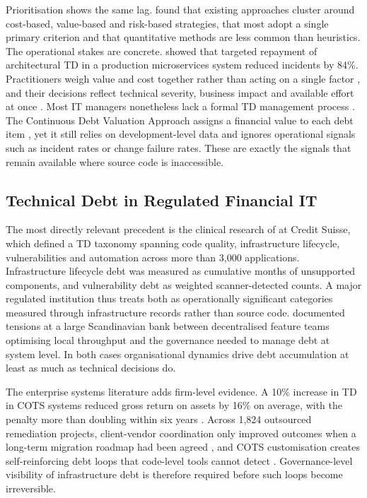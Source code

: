 \documentclass[
  authoryear,
  preprint]{elsarticle}
\begin{document}
Prioritisation shows the same lag.
\citet{lenarduzziSystematicLiteratureReview2021} found that existing
approaches cluster around cost-based, value-based and risk-based
strategies, that most adopt a single primary criterion and that
quantitative methods are less common than heuristics. The operational
stakes are concrete. \citet{detoledoReducingIncidentsMicroservices2021}
showed that targeted repayment of architectural TD in a production
microservices system reduced incidents by 84\%. Practitioners weigh
value and cost together rather than acting on a single factor
\citep{alfayezHowSonarQubeidentifiedTechnical2023}, and their decisions
reflect technical severity, business impact and available effort at once
\citep{pinaTechnicalDebtPrioritization2022}. Most IT managers
nonetheless lack a formal TD management process
\citep{wieseITManagersPerspective2023}. The Continuous Debt Valuation
Approach assigns a financial value to each debt item
\citep{stochelBusinessdrivenTechnicalDebt2023}, yet it still relies on
development-level data and ignores operational signals such as incident
rates or change failure rates. These are exactly the signals that remain
available where source code is inaccessible.

\subsection{Technical Debt in Regulated Financial
IT}\label{technical-debt-in-regulated-financial-it}

The most directly relevant precedent is the clinical research of
\citet{hakiDigitalNudgingTechnical2023} at Credit Suisse, which defined
a TD taxonomy spanning code quality, infrastructure lifecycle,
vulnerabilities and automation across more than 3,000 applications.
Infrastructure lifecycle debt was measured as cumulative months of
unsupported components, and vulnerability debt as weighted
scanner-detected counts. A major regulated institution thus treats both
as operationally significant categories measured through infrastructure
records rather than source code.
\citet{rollandExploringTensionsManagement2021} documented tensions at a
large Scandinavian bank between decentralised feature teams optimising
local throughput and the governance needed to manage debt at system
level. In both cases organisational dynamics drive debt accumulation at
least as much as technical decisions do.

The enterprise systems literature adds firm-level evidence. A 10\%
increase in TD in COTS systems reduced gross return on assets by 16\% on
average, with the penalty more than doubling within six years
\citep{bankerTechnicalDebtFirm2020}. Across 1,824 outsourced remediation
projects, client-vendor coordination only improved outcomes when a
long-term migration roadmap had been agreed
\citep{ramasubbuControllingTechnicalDebt2021}, and COTS customisation
creates self-reinforcing debt loops that code-level tools cannot detect
\citep{rinta-kahilaGettingTrappedTechnical2023}. Governance-level
visibility of infrastructure debt is therefore required before such
loops become irreversible.
\end{document}
